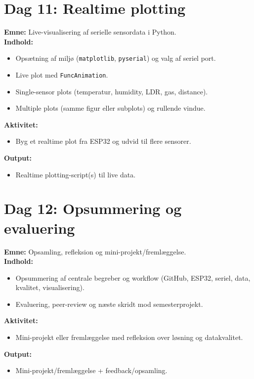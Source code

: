 \documentclass[a4paper,11pt]{article}
\begin{document}
\section{Dag 11: Realtime plotting}

\textbf{Emne:} Live-visualisering af serielle sensordata i Python.\\
\textbf{Indhold:}
\begin{itemize}
  \item Opsætning af miljø (\texttt{matplotlib}, \texttt{pyserial}) og valg af seriel port.
  \item Live plot med \texttt{FuncAnimation}.
  \item Single-sensor plots (temperatur, humidity, LDR, gas, distance).
  \item Multiple plots (samme figur eller subplots) og rullende vindue.
\end{itemize}
\textbf{Aktivitet:}
\begin{itemize}
  \item Byg et realtime plot fra ESP32 og udvid til flere sensorer.
\end{itemize}
\textbf{Output:}
\begin{itemize}
  \item Realtime plotting-script(s) til live data.
\end{itemize}


\section{Dag 12: Opsummering og evaluering}

\textbf{Emne:} Opsamling, refleksion og mini-projekt/fremlæggelse.\\
\textbf{Indhold:}
\begin{itemize}
  \item Opsummering af centrale begreber og workflow (GitHub, ESP32, seriel, data, kvalitet, visualisering).
  \item Evaluering, peer-review og næste skridt mod semesterprojekt.
\end{itemize}
\textbf{Aktivitet:}
\begin{itemize}
  \item Mini-projekt eller fremlæggelse med refleksion over løsning og datakvalitet.
\end{itemize}
\textbf{Output:}
\begin{itemize}
  \item Mini-projekt/fremlæggelse + feedback/opsamling.
\end{itemize}
\end{document}
